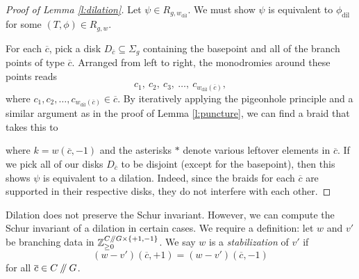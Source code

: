 \documentclass[10pt,twocolumn,amsmath,amssymb,aps,pra,secnumarabic,
    nofootinbib,groupedaddress]{revtex4-1}
\newcommand{\sslash}{\mathbin{/\mkern-5mu/}}
\newcommand{\ord}{\operatorname{ord}}
\newcommand{\dil}{\operatorname{dil}}
\begin{document}
\begin{proof}[Proof of Lemma \ref{l:dilation}]
Let $\psi \in R_{g,w_{\dil}}$.  We must show $\psi$ is equivalent to $\phi_{\dil}$ for some $(T,\phi) \in R_{g,w}$.

For each $\overline{c}$, pick a disk $D_{\overline{c}} \subseteq \Sigma_g$ containing the basepoint and all of the branch points of type $\overline{c}$.  Arranged from left to right, the monodromies around these points reads
\[ c_1, \ c_2, \ c_3, \ \dots, \ c_{w_{\dil}(\overline{c})}, \]
where $c_1,c_2,\dots,c_{w_{\dil}(\overline{c})} \in \overline{c}$.
By iteratively applying the pigeonhole principle and a similar argument as in the proof of Lemma \ref{l:puncture}, we can find a braid that takes this to
\begin{center}
\end{center}

\noindent where $k={w(\overline{c},-1)}$ and the asterisks $*$ denote various leftover elements in $\overline{c}$.  If we pick all of our disks $D_{\overline{c}}$ to be disjoint (except for the basepoint), then this shows $\psi$ is equivalent to a dilation.  Indeed, since the braids for each $\overline{c}$ are supported in their respective disks, they do not interfere with each other.
\end{proof}

Dilation does not preserve the Schur invariant.  However, we can compute the Schur invariant of a dilation in certain cases.  We require a definition: let $w$ and $v'$ be branching data in $\mathbb{Z}_{\ge 0}^{C\sslash G \times \{+1,-1\}}$.  We say $w$ is a \emph{stabilization} of $v'$ if
\[ (w-v')(\overline{c},+1) = (w-v')(\overline{c},-1) \]
for all $\overline{c} \in C\sslash G$.
\end{document}
